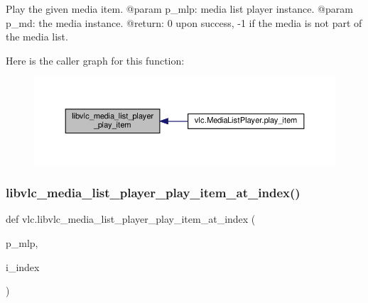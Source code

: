 \begin{DoxyVerb}Play the given media item.
@param p_mlp: media list player instance.
@param p_md: the media instance.
@return: 0 upon success, -1 if the media is not part of the media list.
\end{DoxyVerb}
 Here is the caller graph for this function\+:
\nopagebreak
\begin{figure}[H]
\begin{center}
\leavevmode
\includegraphics[width=350pt]{namespacevlc_a222147643807a3c36fe41538526528d9_icgraph}
\end{center}
\end{figure}
\mbox{\label{namespacevlc_a460c1773285fe9fed9795e86e8039c0d}} 
\subsubsection{\texorpdfstring{libvlc\+\_\+media\+\_\+list\+\_\+player\+\_\+play\+\_\+item\+\_\+at\+\_\+index()}{libvlc\_media\_list\_player\_play\_item\_at\_index()}}
{\footnotesize\ttfamily def vlc.\+libvlc\+\_\+media\+\_\+list\+\_\+player\+\_\+play\+\_\+item\+\_\+at\+\_\+index (\begin{DoxyParamCaption}\item[{}]{p\+\_\+mlp,  }\item[{}]{i\+\_\+index }\end{DoxyParamCaption})}

